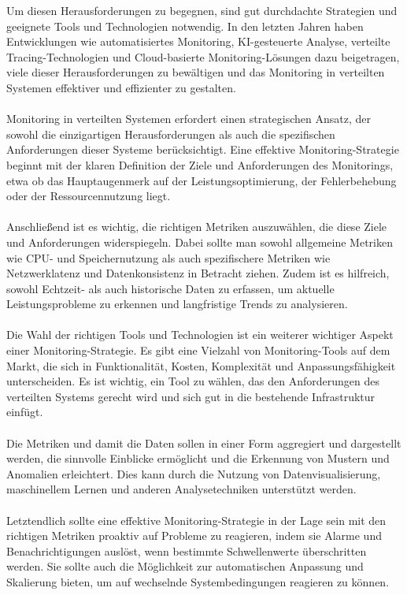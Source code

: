 \documentclass[../vs-script-first-v01.tex]{subfiles}
\begin{document}
Um diesen Herausforderungen zu begegnen, sind gut durchdachte Strategien und geeignete Tools und Technologien notwendig. In den letzten Jahren haben Entwicklungen wie automatisiertes Monitoring, KI-gesteuerte Analyse, verteilte Tracing-Technologien und Cloud-basierte Monitoring-Lösungen dazu beigetragen, viele dieser Herausforderungen zu bewältigen und das Monitoring in verteilten Systemen effektiver und effizienter zu gestalten.
\\\\
Monitoring in verteilten Systemen erfordert einen strategischen Ansatz, der sowohl die einzigartigen Herausforderungen als auch die spezifischen Anforderungen dieser Systeme berücksichtigt. Eine effektive Monitoring-Strategie beginnt mit der klaren Definition der Ziele und Anforderungen des Monitorings, etwa ob das Hauptaugenmerk auf der Leistungsoptimierung, der Fehlerbehebung oder der Ressourcennutzung liegt.
\\\\
Anschließend ist es wichtig, die richtigen Metriken auszuwählen, die diese Ziele und Anforderungen widerspiegeln. Dabei sollte man sowohl allgemeine Metriken wie CPU- und Speichernutzung als auch spezifischere Metriken wie Netzwerklatenz und Datenkonsistenz in Betracht ziehen. Zudem ist es hilfreich, sowohl Echtzeit- als auch historische Daten zu erfassen, um aktuelle Leistungsprobleme zu erkennen und langfristige Trends zu analysieren.
\\\\
Die Wahl der richtigen Tools und Technologien ist ein weiterer wichtiger Aspekt einer Monitoring-Strategie. Es gibt eine Vielzahl von Monitoring-Tools auf dem Markt, die sich in Funktionalität, Kosten, Komplexität und Anpassungsfähigkeit unterscheiden. Es ist wichtig, ein Tool zu wählen, das den Anforderungen des verteilten Systems gerecht wird und sich gut in die bestehende Infrastruktur einfügt.
\\\\
Die Metriken und damit die  Daten sollen in einer Form aggregiert und dargestellt werden, die sinnvolle Einblicke ermöglicht und die Erkennung von Mustern und Anomalien erleichtert. Dies kann durch die Nutzung von Datenvisualisierung, maschinellem Lernen und anderen Analysetechniken unterstützt werden.
\\\\
Letztendlich sollte eine effektive Monitoring-Strategie in der Lage sein mit den richtigen Metriken proaktiv auf Probleme zu reagieren, indem sie Alarme und Benachrichtigungen auslöst, wenn bestimmte Schwellenwerte überschritten werden. Sie sollte auch die Möglichkeit zur automatischen Anpassung und Skalierung bieten, um auf wechselnde Systembedingungen reagieren zu können.
\end{document}
